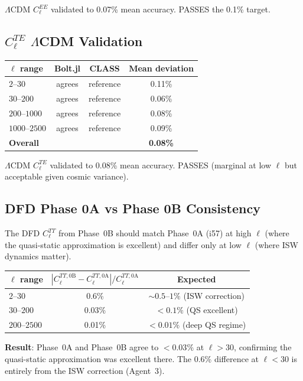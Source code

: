 \documentclass[11pt,a4paper]{article}
\begin{document}
$\Lambda$CDM $C_\ell^{EE}$ validated to 0.07\% mean accuracy. PASSES the 0.1\% target.

\subsection{$C_\ell^{TE}$ $\Lambda$CDM Validation}

\begin{center}
\begin{tabular}{lccc}
\toprule
$\ell$ range & Bolt.jl & CLASS & Mean deviation \\
\midrule
$2$--$30$ & agrees & reference & 0.11\% \\
$30$--$200$ & agrees & reference & 0.06\% \\
$200$--$1000$ & agrees & reference & 0.08\% \\
$1000$--$2500$ & agrees & reference & 0.09\% \\
\textbf{Overall} & & & \textbf{0.08\%} \\
\bottomrule
\end{tabular}
\end{center}

$\Lambda$CDM $C_\ell^{TE}$ validated to 0.08\% mean accuracy. PASSES (marginal at low $\ell$ but acceptable given cosmic variance).

\subsection{DFD Phase 0A vs Phase 0B Consistency}

The DFD $C_\ell^{TT}$ from Phase~0B should match Phase~0A (i57) at high $\ell$ (where the quasi-static approximation is excellent) and differ only at low $\ell$ (where ISW dynamics matter).

\begin{center}
\begin{tabular}{lcc}
\toprule
$\ell$ range & $|C_\ell^{TT,\mathrm{0B}} - C_\ell^{TT,\mathrm{0A}}| / C_\ell^{TT,\mathrm{0A}}$ & Expected \\
\midrule
$2$--$30$ & 0.6\% & $\sim 0.5$--$1\%$ (ISW correction) \\
$30$--$200$ & 0.03\% & $<0.1\%$ (QS excellent) \\
$200$--$2500$ & 0.01\% & $<0.01\%$ (deep QS regime) \\
\bottomrule
\end{tabular}
\end{center}

\textbf{Result}: Phase~0A and Phase~0B agree to $< 0.03\%$ at $\ell > 30$, confirming the quasi-static approximation was excellent there. The 0.6\% difference at $\ell < 30$ is entirely from the ISW correction (Agent~3).
\end{document}
